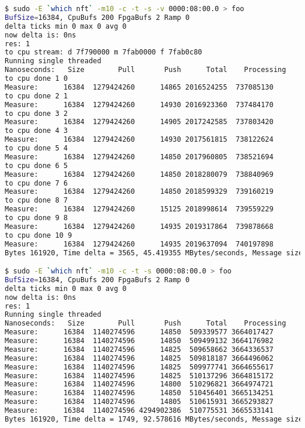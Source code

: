 \begin{lstlisting}[language=bash]
$ sudo -E `which nft` -m10 -c -t -s -v 0000:08:00.0 > foo
BufSize=16384, CpuBufs 200 FpgaBufs 2 Ramp 0
delta ticks min 0 max 0 avg 0
now delta is: 0ns
res: 1
to cpu stream: d 7f790000 m 7fab0000 f 7fab0c80
Running single threaded
Nanoseconds:   Size        Pull       Push      Total    Processing
to cpu done 1 0
Measure:      16384  1279424260      14865 2016524255  737085130
to cpu done 2 1
Measure:      16384  1279424260      14930 2016923360  737484170
to cpu done 3 2
Measure:      16384  1279424260      14905 2017242585  737803420
to cpu done 4 3
Measure:      16384  1279424260      14930 2017561815  738122624
to cpu done 5 4
Measure:      16384  1279424260      14850 2017960805  738521694
to cpu done 6 5
Measure:      16384  1279424260      14850 2018280079  738840969
to cpu done 7 6
Measure:      16384  1279424260      14850 2018599329  739160219
to cpu done 8 7
Measure:      16384  1279424260      15125 2018998614  739559229
to cpu done 9 8
Measure:      16384  1279424260      14935 2019317864  739878668
to cpu done 10 9
Measure:      16384  1279424260      14935 2019637094  740197898
Bytes 161920, Time delta = 3565, 45.419355 MBytes/seconds, Message size 16384

$ sudo -E `which nft` -m10 -c -t -s 0000:08:00.0 > foo
BufSize=16384, CpuBufs 200 FpgaBufs 2 Ramp 0                                      
delta ticks min 0 max 0 avg 0                                                     
now delta is: 0ns                                                                 
res: 1                                                                            
Running single threaded                                                           
Nanoseconds:   Size        Pull       Push      Total    Processing               
Measure:      16384  1140274596      14850  509339577 3664017427                  
Measure:      16384  1140274596      14850  509499132 3664176982                  
Measure:      16384  1140274596      14825  509658662 3664336537                  
Measure:      16384  1140274596      14825  509818187 3664496062                  
Measure:      16384  1140274596      14825  509977741 3664655617                  
Measure:      16384  1140274596      14825  510137296 3664815172                  
Measure:      16384  1140274596      14800  510296821 3664974721                  
Measure:      16384  1140274596      14850  510456401 3665134251                  
Measure:      16384  1140274596      14805  510615931 3665293827                  
Measure:      16384  1140274596 4294902386  510775531 3665533141                  
Bytes 161920, Time delta = 1749, 92.578616 MBytes/seconds, Message size 16384 
\end{lstlisting}

